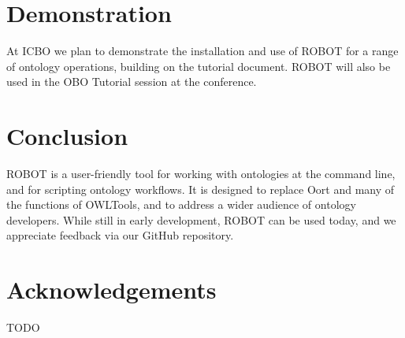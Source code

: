 \documentclass{icbo}
\begin{document}
\section{Demonstration}

At ICBO we plan to demonstrate the installation and use of ROBOT for a range of ontology operations, building on the tutorial document. ROBOT will also be used in the OBO Tutorial session at the conference.


\section{Conclusion}

ROBOT is a user-friendly tool for working with ontologies at the command line, and for scripting ontology workflows. It is designed to replace Oort and many of the functions of OWLTools, and to address a wider audience of ontology developers. While still in early development, ROBOT can be used today, and we appreciate feedback via our GitHub repository.


\section*{Acknowledgements}

TODO






\vspace{120pt}
\end{document}
